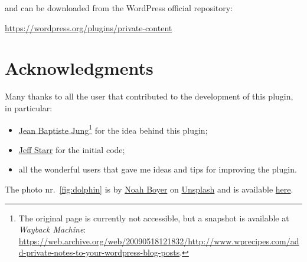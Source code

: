 	\noindent and can be downloaded from the WordPress official repository:
	\begin{center}
	\url{https://wordpress.org/plugins/private-content}
	\end{center}

	\section*{Acknowledgments}

	Many thanks to all the user that contributed to the development of this
	plugin, in particular:

	\begin{itemize}
		\item
		\href{http://www.wprecipes.com/add-private-notes-to-your-wordpress-blog-posts}{Jean
		Baptiste Jung}\footnote{The original page is currently not accessible, but a
		snapshot is available at \emph{Wayback Machine}:
		\url{https://web.archive.org/web/20090518121832/http://www.wprecipes.com/add-private-notes-to-your-wordpress-blog-posts}.}
		for the idea behind this plugin;
		\item \href{http://digwp.com/2010/05/private-content-posts-shortcode}{Jeff Starr}
		for the initial code;
		\item all the wonderful users that gave me ideas and tips for improving
		the plugin.
	\end{itemize}

	\noindent The photo nr.~\vref{fig:dolphin} is by
	\href{https://unsplash.com/@emerald_}{Noah Boyer} on
	\href{https://unsplash.com}{Unsplash} and is available \href{https://unsplash.com/photos/dgBOx1e3Mbs}{here}.

\endgroup